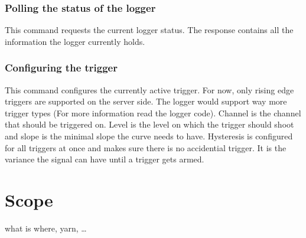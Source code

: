 
\subsection{Polling the status of the logger}

This command requests the current logger status.
The response contains all the information the logger currently holds.


\subsection{Configuring the trigger}

This command configures the currently active trigger.
For now, only rising edge triggers are supported on the server side. The logger would support way more trigger types (For more information read the logger code).
Channel is the channel that should be triggered on.
Level is the level on which the trigger should shoot and slope is the minimal slope the curve needs to have.
Hysteresis is configured for all triggers at once and makes sure there is no accidential trigger. It is the variance the signal can have until a trigger gets armed.



\chapter{Scope} %
\label{ch:devguide:scope}
what is where, yarn, \ldots


